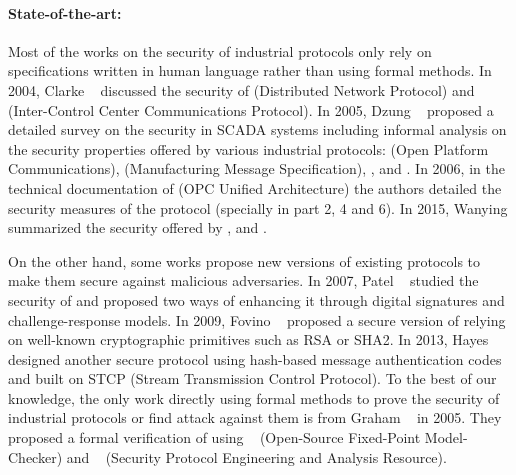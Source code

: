 \paragraph{State-of-the-art:}\label{sec:intro_sota}

Most of the works on the security of industrial protocols only rely on
specifications written in human language rather than using formal methods.
In 2004, Clarke \etal~\cite{CR04} discussed the security of \dnp
(Distributed Network Protocol) and \iccp (Inter-Control Center Communications
Protocol).
In 2005, Dzung \etal~\cite{DNHC05} proposed a detailed survey on the security in
SCADA systems including informal analysis on the security properties offered by
various industrial protocols: \opc (Open Platform Communications),
\mms (Manufacturing Message Specification),
, \iccp and \etherip.
In 2006, in the technical documentation of \opcua (OPC Unified Architecture) the
authors detailed the security measures of the protocol (specially in part 2, 4
and 6).
In 2015, Wanying \etal summarized the security offered by \modbus, \dnp and
\opcua.

On the other hand, some works propose new versions of existing protocols to make
them secure against malicious adversaries.
In 2007, Patel \etal~\cite{PY07} studied the security of \dnp and proposed two
ways of enhancing it through digital signatures and challenge-response models.
In 2009, Fovino \etal~\cite{FCMT09} proposed a secure version of \modbus
relying on well-known cryptographic primitives such as RSA or SHA2.
In 2013, Hayes \etal~\cite{HE13} designed another secure \modbus protocol using
hash-based message authentication codes and built on STCP (Stream
Transmission Control Protocol).
%
To the best of our knowledge, the only work directly using formal
methods to prove the security of industrial protocols or find attack
against them is from Graham \etal~\cite{GP05} in 2005.  They proposed
a formal verification of \dnp using \ofmc~\cite{BMV03} (Open-Source
Fixed-Point Model-Checker) and
\spear~\cite{SH01} (Security Protocol Engineering and Analysis Resource).

